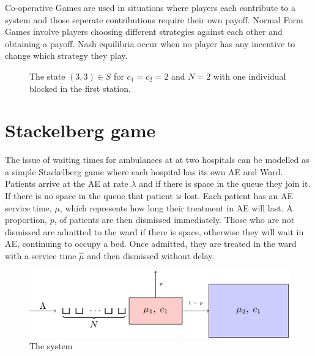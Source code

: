 \documentclass[a0,landscape]{a0poster}
\begin{document}
\begin{multicols}{3}
Co-operative Games are used in situations where players each contribute to a system and those seperate contributions require their own payoff.
Normal Form Games involve players choosing different strategies against each other and obtaining a payoff.
Nash equilibria occur when no player has any incentive to change which strategy they play.

\begin{figure}[H]
\color{black}
    \centering
    \caption{The state $(3,3)\in S$ for $c_1=c_2=2$ and $N=2$ with one individual blocked in the first station.}\label{fig:state}
\end{figure}

\color{Goldenrod}
\section*{Stackelberg game}
The issue of waiting times for ambulances at at two hospitals can be modelled as a simple Stackelberg game where each hospital has its own AE and Ward.
Patients arrive at the AE at rate $\lambda$ and if there is space in the queue they join it.
If there is no space in the queue that patient is lost.
Each patient has an AE service time, $\mu$, which represents how long their treatment in AE will last.
A proportion, $p$, of patients are then dismissed immediately.
Those who are not dismissed are admitted to the ward if there is space, otherwise they will wait in AE, continuing to occupy a bed.
Once admitted, they are treated in the ward with a service time $\hat{\mu}$ and then dismissed without delay.

\begin{figure}[H]
\centering
\includegraphics[width=0.9\linewidth]{Images/tandem_queue.png}
\caption{The system}
\label{fig:tandem_queue}
\end{figure}


\end{multicols}
\end{document}
